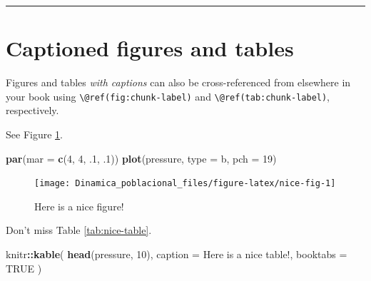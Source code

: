 \documentclass[
]{book}
\newenvironment{Shaded}{\begin{snugshade}}{\end{snugshade}}
\newcommand{\AttributeTok}[1]{\textcolor[rgb]{0.13,0.29,0.53}{#1}}
\newcommand{\ConstantTok}[1]{\textcolor[rgb]{0.56,0.35,0.01}{#1}}
\newcommand{\DecValTok}[1]{\textcolor[rgb]{0.00,0.00,0.81}{#1}}
\newcommand{\FunctionTok}[1]{\textcolor[rgb]{0.13,0.29,0.53}{\textbf{#1}}}
\newcommand{\NormalTok}[1]{#1}
\newcommand{\SpecialCharTok}[1]{\textcolor[rgb]{0.81,0.36,0.00}{\textbf{#1}}}
\newcommand{\StringTok}[1]{\textcolor[rgb]{0.31,0.60,0.02}{#1}}
\theoremstyle{definition}
\theoremstyle{definition}
\theoremstyle{definition}
\theoremstyle{definition}
\theoremstyle{remark}
\begin{document}
\begin{center}\rule{0.5\linewidth}{0.5pt}\end{center}

\hypertarget{captioned-figures-and-tables}{%
\section{Captioned figures and tables}\label{captioned-figures-and-tables}}

Figures and tables \emph{with captions} can also be cross-referenced from elsewhere in your book using \texttt{\textbackslash{}@ref(fig:chunk-label)} and \texttt{\textbackslash{}@ref(tab:chunk-label)}, respectively.

See Figure \ref{fig:nice-fig}.

\begin{Shaded}
\begin{Highlighting}[]
\FunctionTok{par}\NormalTok{(}\AttributeTok{mar =} \FunctionTok{c}\NormalTok{(}\DecValTok{4}\NormalTok{, }\DecValTok{4}\NormalTok{, .}\DecValTok{1}\NormalTok{, .}\DecValTok{1}\NormalTok{))}
\FunctionTok{plot}\NormalTok{(pressure, }\AttributeTok{type =} \StringTok{\textquotesingle{}b\textquotesingle{}}\NormalTok{, }\AttributeTok{pch =} \DecValTok{19}\NormalTok{)}
\end{Highlighting}
\end{Shaded}

\begin{figure}

{\centering \texttt{[image: Dinamica\_poblacional\_files/figure-latex/nice-fig-1]} 

}

\caption{Here is a nice figure!}\label{fig:nice-fig}
\end{figure}

Don't miss Table \ref{tab:nice-table}.

\begin{Shaded}
\begin{Highlighting}[]
\NormalTok{knitr}\SpecialCharTok{::}\FunctionTok{kable}\NormalTok{(}
  \FunctionTok{head}\NormalTok{(pressure, }\DecValTok{10}\NormalTok{), }\AttributeTok{caption =} \StringTok{\textquotesingle{}Here is a nice table!\textquotesingle{}}\NormalTok{,}
  \AttributeTok{booktabs =} \ConstantTok{TRUE}
\NormalTok{)}
\end{Highlighting}
\end{Shaded}
\end{document}
